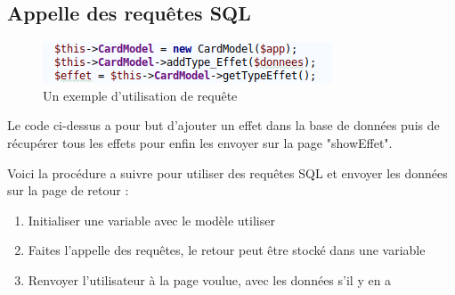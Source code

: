 \documentclass[a4paper,11pt]{report}
\begin{document}
	\subsection{Appelle des requêtes SQL}
	 \begin{figure}[th]
     		 \begin{center}
        	\includegraphics[scale=0.4]{Assets/requete.png}
       		 \caption{Un exemple d'utilisation de requête}
       		 \label{fig9}
     		 \end{center}
   	 \end{figure}
	
	Le code ci-dessus a pour but d'ajouter un effet dans la base de données puis de récupérer tous les effets pour enfin les envoyer sur la page "showEffet".

	Voici la procédure a suivre pour utiliser des requêtes SQL et envoyer les données sur la page de retour :
	\begin{enumerate}
		\item Initialiser une variable avec le modèle utiliser
		\item Faites l'appelle des requêtes, le retour peut être stocké dans une variable
		\item Renvoyer l'utilisateur à la page voulue, avec les données s'il y en a
	\end{enumerate}
	

      

  \listoffigures  
\end{document}
